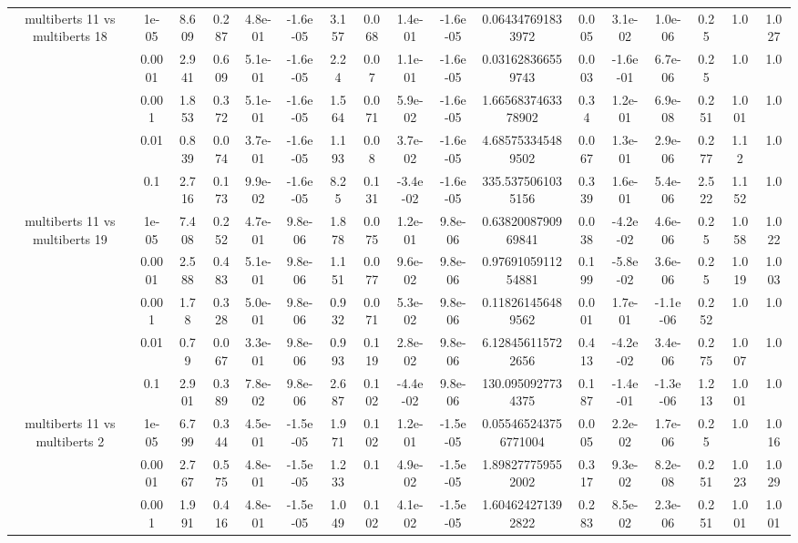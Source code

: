 \begin{tabular}{|c|c|c|c|c|c|c|c|c|c|c|c|c|c|c|c|c|}
\hline
\multirow{5}{*}{multiberts 11 vs multiberts 18} & 1e-05 & 8.609 & 0.287 & 4.8e-01 & -1.6e-05 & 3.157 & 0.068 & 1.4e-01 & -1.6e-05 & 0.064347691833972 & 0.005 & 3.1e-02 & 1.0e-06 & 0.25 & 1.0 & 1.027 \\
 & 0.0001 & 2.941 & 0.609 & 5.1e-01 & -1.6e-05 & 2.24 & 0.07 & 1.1e-01 & -1.6e-05 & 0.031628366559743 & 0.003 & -1.6e-01 & 6.7e-06 & 0.25 & 1.0 & 1.0 \\
 & 0.001 & 1.853 & 0.372 & 5.1e-01 & -1.6e-05 & 1.564 & 0.071 & 5.9e-02 & -1.6e-05 & 1.6656837463378902 & 0.34 & 1.2e-01 & 6.9e-08 & 0.251 & 1.001 & 1.0 \\
 & 0.01 & 0.839 & 0.074 & 3.7e-01 & -1.6e-05 & 1.193 & 0.08 & 3.7e-02 & -1.6e-05 & 4.685753345489502 & 0.067 & 1.3e-01 & 2.9e-06 & 0.277 & 1.12 & 1.0 \\
 & 0.1 & 2.716 & 0.173 & 9.9e-02 & -1.6e-05 & 8.25 & 0.131 & -3.4e-02 & -1.6e-05 & 335.5375061035156 & 0.339 & 1.6e-01 & 5.4e-06 & 2.522 & 1.152 & 1.0 \\
\hline
\multirow{5}{*}{multiberts 11 vs multiberts 19} & 1e-05 & 7.408 & 0.252 & 4.7e-01 & 9.8e-06 & 1.878 & 0.075 & 1.2e-01 & 9.8e-06 & 0.6382008790969841 & 0.038 & -4.2e-02 & 4.6e-06 & 0.25 & 1.058 & 1.022 \\
 & 0.0001 & 2.588 & 0.483 & 5.1e-01 & 9.8e-06 & 1.151 & 0.077 & 9.6e-02 & 9.8e-06 & 0.9769105911254881 & 0.199 & -5.8e-02 & 3.6e-06 & 0.25 & 1.019 & 1.003 \\
 & 0.001 & 1.78 & 0.328 & 5.0e-01 & 9.8e-06 & 0.932 & 0.071 & 5.3e-02 & 9.8e-06 & 0.118261456489562 & 0.001 & 1.7e-01 & -1.1e-06 & 0.252 & 1.0 & 1.0 \\
 & 0.01 & 0.79 & 0.067 & 3.3e-01 & 9.8e-06 & 0.993 & 0.119 & 2.8e-02 & 9.8e-06 & 6.128456115722656 & 0.413 & -4.2e-02 & 3.4e-06 & 0.275 & 1.007 & 1.0 \\
 & 0.1 & 2.901 & 0.389 & 7.8e-02 & 9.8e-06 & 2.687 & 0.102 & -4.4e-02 & 9.8e-06 & 130.0950927734375 & 0.187 & -1.4e-01 & -1.3e-06 & 1.213 & 1.001 & 1.0 \\
\hline
\multirow{5}{*}{multiberts 11 vs multiberts 2} & 1e-05 & 6.799 & 0.344 & 4.5e-01 & -1.5e-05 & 1.971 & 0.102 & 1.2e-01 & -1.5e-05 & 0.055465243756771004 & 0.005 & 2.2e-02 & 1.7e-06 & 0.25 & 1.0 & 1.016 \\
 & 0.0001 & 2.767 & 0.575 & 4.8e-01 & -1.5e-05 & 1.233 & 0.1 & 4.9e-02 & -1.5e-05 & 1.898277759552002 & 0.317 & 9.3e-02 & 8.2e-08 & 0.251 & 1.023 & 1.029 \\
 & 0.001 & 1.991 & 0.416 & 4.8e-01 & -1.5e-05 & 1.049 & 0.102 & 4.1e-02 & -1.5e-05 & 1.604624271392822 & 0.283 & 8.5e-02 & 2.3e-06 & 0.251 & 1.001 & 1.001 \\

\end{tabular}
